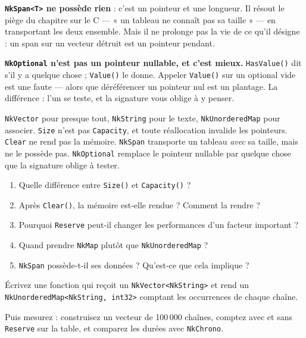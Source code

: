 \begin{nkretenir}
\textbf{\texttt{NkSpan<T>} ne possède rien} : c'est un pointeur et une longueur.
Il résout le piège du chapitre sur le C --- « un tableau ne connaît pas sa
taille » --- en transportant les deux ensemble. Mais il ne prolonge pas la vie de
ce qu'il désigne : un span sur un vecteur détruit est un pointeur pendant.
\end{nkretenir}

\begin{nkpiege}
\textbf{\texttt{NkOptional} n'est pas un pointeur nullable, et c'est mieux.}
\texttt{HasValue()} dit s'il y a quelque chose ; \texttt{Value()} le donne.
Appeler \texttt{Value()} sur un optional vide est une faute --- alors que
déréférencer un pointeur nul est un plantage. La différence : l'un se teste, et
la signature vous oblige à y penser.
\end{nkpiege}

\begin{nkbilan}
\texttt{NkVector} pour presque tout, \texttt{NkString} pour le texte,
\texttt{NkUnorderedMap} pour associer. \texttt{Size} n'est pas \texttt{Capacity},
et toute réallocation invalide les pointeurs. \texttt{Clear} ne rend pas la
mémoire. \texttt{NkSpan} transporte un tableau \emph{avec} sa taille, mais ne le
possède pas. \texttt{NkOptional} remplace le pointeur nullable par quelque chose
que la signature oblige à tester.
\end{nkbilan}

\begin{nkquestions}
\begin{enumerate}
\item Quelle différence entre \texttt{Size()} et \texttt{Capacity()} ?
\item Après \texttt{Clear()}, la mémoire est-elle rendue ? Comment la rendre ?
\item Pourquoi \texttt{Reserve} peut-il changer les performances d'un facteur
      important ?
\item Quand prendre \texttt{NkMap} plutôt que \texttt{NkUnorderedMap} ?
\item \texttt{NkSpan} possède-t-il ses données ? Qu'est-ce que cela implique ?
\end{enumerate}
\end{nkquestions}

\begin{nkpratique}
Écrivez une fonction qui reçoit un \texttt{NkVector<NkString>} et rend un
\texttt{NkUnorderedMap<NkString, int32>} comptant les occurrences de chaque
chaîne.

Puis mesurez : construisez un vecteur de 100\,000 chaînes, comptez avec et sans
\texttt{Reserve} sur la table, et comparez les durées avec \texttt{NkChrono}.
\end{nkpratique}

